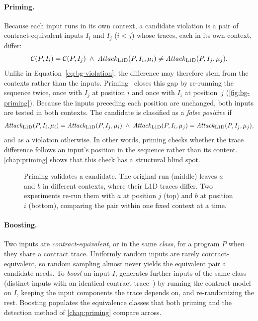 \paragraph{Priming.}
Because each input runs in its own context, a candidate violation is a pair of contract-equivalent
inputs $I_i$ and $I_j$ ($i<j$) whose traces, each in its own context, differ:
\begin{equation}
\mathcal{C}(P,I_i) = \mathcal{C}(P,I_j) \;\land\; \mathit{Attack}_{\mathrm{L1D}}(P,I_i,\mu_i) \neq \mathit{Attack}_{\mathrm{L1D}}(P,I_j,\mu_j).
\label{eq:bg-candidate}
\end{equation}
Unlike in Equation~\eqref{eq:bg-violation}, the difference may therefore stem from the contexts
rather than the inputs. Priming~\cite{revizor} closes this gap by re-running the sequence twice,
once with $I_j$ at position $i$ and once with $I_i$ at position~$j$ (\autoref{fig:bg-priming}).
Because the inputs preceding each position are unchanged, both inputs are tested in both contexts.
The candidate is classified as a \emph{false positive} if
\begin{equation}
\mathit{Attack}_{\mathrm{L1D}}(P,I_i,\mu_i) = \mathit{Attack}_{\mathrm{L1D}}(P,I_j,\mu_i) \;\land\; \mathit{Attack}_{\mathrm{L1D}}(P,I_i,\mu_j) = \mathit{Attack}_{\mathrm{L1D}}(P,I_j,\mu_j),
\label{eq:bg-priming}
\end{equation}
and as a violation otherwise. In other words, priming checks whether the trace difference follows
an input's position in the sequence rather than its content. \autoref{chap:priming} shows that this
check has a structural blind spot.

\begin{figure}[h]
\centering
\fitwidth{}
\caption{Priming validates a candidate. The original run (middle) leaves $a$ and $b$ in different
contexts, where their L1D traces differ. Two experiments re-run them with $a$ at position $j$ (top)
and $b$ at position $i$ (bottom), comparing the pair within one fixed context at a time.}
\label{fig:bg-priming}
\end{figure}

\paragraph{Boosting.}
Two inputs are \emph{contract-equivalent}, or in the same \emph{class}, for a program $P$ when they
share a contract trace. Uniformly random inputs are rarely contract-equivalent, so random sampling
almost never yields the equivalent pair a candidate needs. To \emph{boost} an input $I$, \revizor{} generates further inputs of the
same class (distinct inputs with an identical contract trace~\cite{revizor,hide_seek}) by running
the contract model on $I$, keeping the input components the trace depends on, and re-randomizing the
rest. Boosting populates the equivalence classes that both priming and the detection method of
\autoref{chap:priming} compare across.
